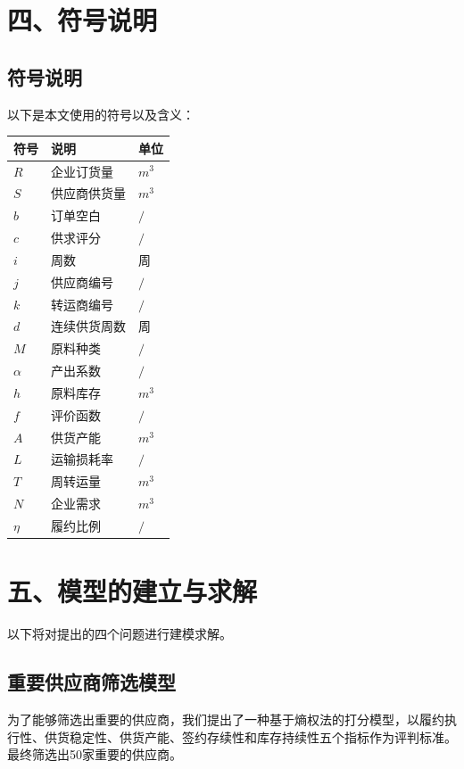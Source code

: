 \documentclass{my_paper}
\begin{document}
\section{四、符号说明}

\subsection{符号说明}
以下是本文使用的符号以及含义：
\begin{table}[h]%
    \centering
    \begin{tabular}{p{2.0cm}<{\centering}p{9.0cm}<{\centering}p{2.0cm}<{\centering}}
    \hline
    符号 & 说明 & 单位 \\ %
    \hline
    $R$ & 企业订货量 &  $m^3$\\
    $S$ & 供应商供货量 &  $m^3$\\
    $b$ & 订单空白 &  $/$\\
    $c$ & 供求评分 &  $/$\\
    $i$ & 周数 &  周\\
    $j$ & 供应商编号 &  $/$\\
    $k$ & 转运商编号 &  $/$\\
    $d$ & 连续供货周数 &  周\\
    $M$ & 原料种类 &  $/$\\
    $\alpha$ & 产出系数 &  $/$\\
    $h$ & 原料库存 &  $m^3$\\
    $f$ & 评价函数 &  $/$\\
    $A$ & 供货产能 &  $m^3$\\
    $L$ & 运输损耗率 &  $/$\\
    $T$ & 周转运量 &  $m^3$\\
    $N$ & 企业需求 &  $m^3$\\
    $\eta$ & 履约比例 &  $/$\\
    \hline
    \end{tabular}
\end{table}
\newpage
\section{五、模型的建立与求解}

以下将对提出的四个问题进行建模求解。

\subsection{重要供应商筛选模型}
为了能够筛选出重要的供应商，我们提出了一种基于熵权法的打分模型，以履约执行性、供货稳定性、供货产能、签约存续性和库存持续性五个指标作为评判标准。最终筛选出50家重要的供应商。
\end{document}
